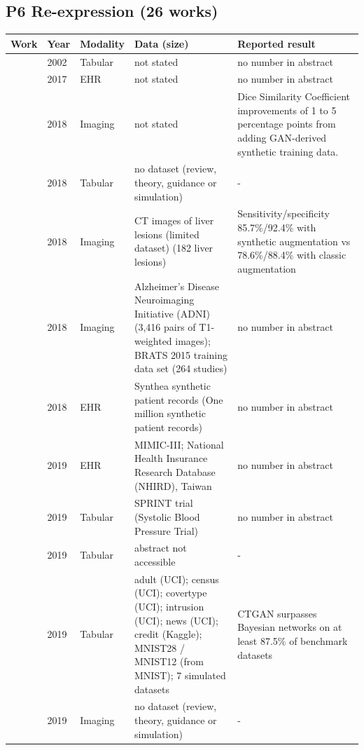 \subsection*{P6 Re-expression (26 works)}
\begin{longtable}{@{}p{2.6cm}p{0.7cm}p{1.2cm}p{4.4cm}p{4.6cm}@{}}
\toprule
Work & Year & Modality & Data (size) & Reported result\\
\midrule
\endhead
\cite{chawla2002smote} & 2002 & Tabular & not stated & no number in abstract\\
\cite{choi2017generating} & 2017 & EHR & not stated & no number in abstract\\
\cite{bowles2018gan} & 2018 & Imaging & not stated & Dice Similarity Coefficient improvements of 1 to 5 percentage points from adding GAN-derived synthetic training data.\\
\cite{fernandez2018smote} & 2018 & Tabular & no dataset (review, theory, guidance or simulation) & -\\
\cite{fridadar2018gan} & 2018 & Imaging & CT images of liver lesions (limited dataset) (182 liver lesions) & Sensitivity/specificity 85.7\%/92.4\% with synthetic augmentation vs 78.6\%/88.4\% with classic augmentation\\
\cite{shin2018medical} & 2018 & Imaging & Alzheimer's Disease Neuroimaging Initiative (ADNI) (3,416 pairs of T1-weighted images); BRATS 2015 training data set (264 studies) & no number in abstract\\
\cite{walonoski2018synthea} & 2018 & EHR & Synthea synthetic patient records (One million synthetic patient records) & no number in abstract\\
\cite{baowaly2019synthesizing} & 2019 & EHR & MIMIC-III; National Health Insurance Research Database (NHIRD), Taiwan & no number in abstract\\
\cite{beaulieujones2019privacy} & 2019 & Tabular & SPRINT trial (Systolic Blood Pressure Trial) & no number in abstract\\
\cite{jordon2019pate} & 2019 & Tabular & abstract not accessible & -\\
\cite{xu2019modeling} & 2019 & Tabular & adult (UCI); census (UCI); covertype (UCI); intrusion (UCI); news (UCI); credit (Kaggle); MNIST28 / MNIST12 (from MNIST); 7 simulated datasets & CTGAN surpasses Bayesian networks on at least 87.5\% of benchmark datasets\\
\cite{yi2019generative} & 2019 & Imaging & no dataset (review, theory, guidance or simulation) & -\\

\end{longtable}
